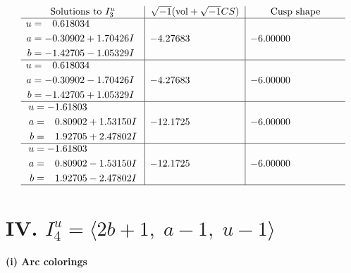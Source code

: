 \documentclass[1p]{elsarticle_modified}
\theoremstyle{definition}
\newcommand{\I}{\sqrt{-1}}
\begin{document}
$$\begin{array}{c|c|c}  
\text{Solutions to }I^u_{3}& \I (\text{vol} + \sqrt{-1}CS) & \text{Cusp shape}\\
 \hline 
\begin{aligned}
u &= \phantom{-}0.618034\phantom{ +0.000000I} \\
a &= -0.30902 + 1.70426 I \\
b &= -1.42705 - 1.05329 I\end{aligned}
 & -4.27683\phantom{ +0.000000I} & -6.00000\phantom{ +0.000000I} \\ \hline\begin{aligned}
u &= \phantom{-}0.618034\phantom{ +0.000000I} \\
a &= -0.30902 - 1.70426 I \\
b &= -1.42705 + 1.05329 I\end{aligned}
 & -4.27683\phantom{ +0.000000I} & -6.00000\phantom{ +0.000000I} \\ \hline\begin{aligned}
u &= -1.61803\phantom{ +0.000000I} \\
a &= \phantom{-}0.80902 + 1.53150 I \\
b &= \phantom{-}1.92705 + 2.47802 I\end{aligned}
 & -12.1725\phantom{ +0.000000I} & -6.00000\phantom{ +0.000000I} \\ \hline\begin{aligned}
u &= -1.61803\phantom{ +0.000000I} \\
a &= \phantom{-}0.80902 - 1.53150 I \\
b &= \phantom{-}1.92705 - 2.47802 I\end{aligned}
 & -12.1725\phantom{ +0.000000I} & -6.00000\phantom{ +0.000000I}\\
 \hline 
 \end{array}$$\newpage\newpage\renewcommand{\arraystretch}{1}
\centering \section*{IV. $I^u_{4}= \langle 2 b+1,\;a-1,\;u-1 \rangle$}
\flushleft \textbf{(i) Arc colorings}\\
\end{document}
